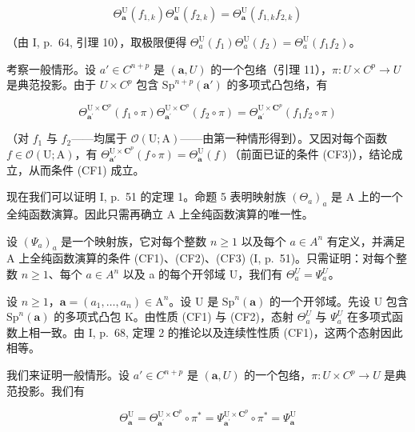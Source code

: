 \[
\Theta_ {\boldsymbol {a}} ^ {\mathrm{U}} (f _ {1, k}) \Theta_ {\boldsymbol {a}} ^ {\mathrm{U}} (f _ {2, k}) = \Theta_ {\boldsymbol {a}} ^ {\mathrm{U}} (f _ {1, k} f _ {2, k})
\]

（由 I, p.~64, 引理 10），取极限便得 \(\Theta_{a}^{\mathrm{U}}(f_{1})\Theta_{a}^{\mathrm{U}}(f_{2}) = \Theta_{a}^{\mathrm{U}}(f_{1}f_{2})\)。

考察一般情形。设 \(a' \in C^{n+p}\) 是 \((\boldsymbol{a}, U)\) 的一个包络（引理 11），\(\pi: U \times C^{p} \to U\) 是典范投影。由于 \(U \times C^{p}\) 包含 \(\mathrm{Sp}^{n+p}(\boldsymbol{a}')\) 的多项式凸包络，有

\[
\Theta_ {\boldsymbol {a} ^ {\prime}} ^ {\mathrm{U} \times \mathbf {C} ^ {p}} (f _ {1} \circ \pi) \Theta_ {\boldsymbol {a} ^ {\prime}} ^ {\mathrm{U} \times \mathbf {C} ^ {p}} (f _ {2} \circ \pi) = \Theta_ {\boldsymbol {a} ^ {\prime}} ^ {\mathrm{U} \times \mathbf {C} ^ {p}} (f _ {1} f _ {2} \circ \pi)
\]

（对 \(f_1\) 与 \(f_2\)——均属于 \(\mathcal{O}(\mathrm{U};\mathrm{A})\)——由第一种情形得到）。又因对每个函数 \(f \in \mathcal{O}(\mathrm{U};\mathrm{A})\)，有 \(\Theta_{\boldsymbol{a}'}^{\mathrm{U}\times \mathbf{C}^p}(f\circ \pi) = \Theta_{\boldsymbol{a}}^{\mathrm{U}}(f)\)（前面已证的条件 (CF3)），结论成立，从而条件 (CF1) 成立。

现在我们可以证明 I, p.~51 的定理 1。命题 5 表明映射族 \((\Theta_{a})_{a}\) 是 A 上的一个全纯函数演算。因此只需再确立 A 上全纯函数演算的唯一性。

设 \((\Psi_{a})_{a}\) 是一个映射族，它对每个整数 \(n \geqslant 1\) 以及每个 \(a \in A^{n}\) 有定义，并满足 A 上全纯函数演算的条件 (CF1)、(CF2)、(CF3) (I, p.~51)。只需证明：对每个整数 \(n \geqslant 1\)、每个 \(a \in A^{n}\) 以及 a 的每个开邻域 U，我们有 \(\Theta_{a}^{U} = \Psi_{a}^{U}\)。

设 \(n \geqslant 1\)，\(\boldsymbol{a} = (a_{1}, \ldots, a_{n}) \in \mathrm{A}^{n}\)。设 U 是 \(\mathrm{Sp}^{n}(\boldsymbol{a})\) 的一个开邻域。先设 U 包含 \(\mathrm{Sp}^{n}(\boldsymbol{a})\) 的多项式凸包 K。由性质 (CF1) 与 (CF2)，态射 \(\Theta_{a}^{U}\) 与 \(\Psi_{a}^{U}\) 在多项式函数上相一致。由 I, p.~68, 定理 2 的推论以及连续性性质 (CF1)，这两个态射因此相等。

我们来证明一般情形。设 \(a' \in C^{n+p}\) 是 \((\boldsymbol{a}, U)\) 的一个包络，\(\pi: U \times C^{p} \to U\) 是典范投影。我们有

\[
\Theta_ {\boldsymbol {a}} ^ {\mathrm{U}} = \Theta_ {\boldsymbol {a} ^ {\prime}} ^ {\mathrm{U} \times \mathbf {C} ^ {p}} \circ \pi^ {*} = \Psi_ {\boldsymbol {a} ^ {\prime}} ^ {\mathrm{U} \times \mathbf {C} ^ {p}} \circ \pi^ {*} = \Psi_ {\boldsymbol {a}} ^ {\mathrm{U}}
\]

